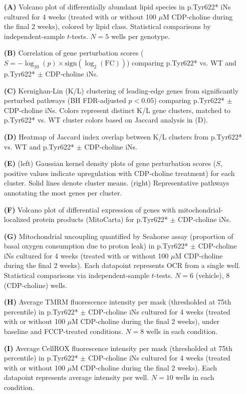\begin{itemize}
    \item[\textbf{(A)}] Volcano plot of differentially abundant lipid species in p.Tyr622* iNs cultured for 4 weeks (treated with or without 100 $\mu$M CDP-choline during the final 2 weeks), colored by lipid class.  Statistical comparisons by independent-sample $t$-tests. $N=5$ wells per genotype.
    \item[\textbf{(B)}] Correlation of gene perturbation scores ($S = -\log_{10}(p)\times\text{sign}(\log_2(\text{FC}))$) comparing p.Tyr622* vs. WT and p.Tyr622* $\pm$ CDP-choline iNs.
    \item[\textbf{(C)}] Kernighan-Lin (K/L) clustering of leading-edge genes from significantly perturbed pathways (BH FDR-adjusted $p<0.05$) comparing p.Tyr622* $\pm$ CDP-choline iNs. Colors represent distinct K/L gene clusters, matched to p.Tyr622* vs. WT cluster colors based on Jaccard analysis in (D).
    \item[\textbf{(D)}] Heatmap of Jaccard index overlap between K/L clusters from p.Tyr622* vs. WT and p.Tyr622* $\pm$ CDP-choline iNs.
    \item[\textbf{(E)}] (left) Gaussian kernel density plots of gene perturbation scores ($S$, positive values indicate upregulation with CDP-choline treatment) for each cluster. Solid lines denote cluster means. (right) Representative pathways annotating the most genes per cluster.
    \item[\textbf{(F)}] Volcano plot of differential expression of genes with mitochondrial-localized protein products (MitoCarta) for p.Tyr622* $\pm$ CDP-choline iNs.
    \item[\textbf{(G)}] Mitochondrial uncoupling quantified by Seahorse assay (proportion of basal oxygen consumption due to proton leak) in p.Tyr622* $\pm$ CDP-choline iNs cultured for 4 weeks (treated with or without 100 $\mu$M CDP-choline during the final 2 weeks). Each datapoint represents OCR from a single well. Statistical comparisons via independent-sample $t$-tests. $N=6$ (vehicle), $8$ (CDP-choline) wells.
    \item[\textbf{(H)}] Average TMRM fluorescence intensity per mask (thresholded at 75th percentile) in p.Tyr622* $\pm$ CDP-choline iNs cultured for 4 weeks (treated with or without 100 $\mu$M CDP-choline during the final 2 weeks), under baseline and FCCP-treated conditions. $N=8$ wells in each condition.
    \item[\textbf{(I)}] Average CellROX fluorescence intensity per mask (thresholded at 75th percentile) in p.Tyr622* $\pm$ CDP-choline iNs cultured for 4 weeks (treated with or without 100 $\mu$M CDP-choline during the final 2 weeks). Each datapoint represents average intensity per well. $N=10$ wells in each condition.

\end{itemize}
